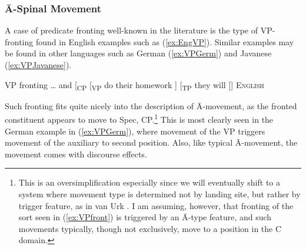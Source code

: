 \documentclass[output=paper,colorlinks,citecolor=brown,
]{langscibook}
\begin{document}
\subsubsection{\=A-Spinal Movement}

A case of predicate fronting well-known in the literature is the type of VP-fronting found in English examples such as (\ref{ex:EngVP}).  Similar examples may be found in other languages such as German (\ref{ex:VPGerm}) and Javanese (\ref{ex:VPJavanese}).

\ea VP fronting \label{ex:VPfront}
    \ea  \ldots{} and {[}\textsubscript{CP} {[}\textsubscript{VP} do their homework ] {[}\textsubscript{TP} they will \underline{\hspace{.5cm}} {]]} \hfill \textsc{English}\label{ex:EngVP}\\
{}
\z
\z 

Such fronting fits quite nicely into the description of \=A-movement, as the fronted constituent appears to move to Spec, CP.\footnote{This is an oversimplification especially since we will eventually shift to a system where movement type is determined not by landing site, but rather by trigger feature, as in van Urk \citeyearpar{vanUrk:2015a}. I am assuming, however, that fronting of the sort seen in (\ref{ex:VPfront}) is triggered by an \=A-type feature, and such movements typically, though not exclusively, move to a position in the C domain.}  This is most clearly seen in the German example in  (\ref{ex:VPGerm}), where movement of the VP triggers movement of the auxiliary to second position.  Also, like typical \=A-movement, the movement comes with discourse effects.
\end{document}
